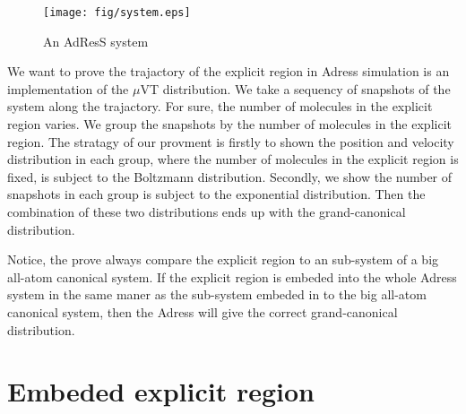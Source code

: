\documentclass[aps,pre,preprint]{revtex4}
\begin{document}



\begin{figure}
  \centering
  \texttt{[image: fig/system.eps]}
  \caption{An AdResS system}
  \label{fig:tmp1}
\end{figure}


We want to prove the trajactory of the explicit region in Adress
simulation is an implementation of the $\mu$VT distribution. We take a
sequency of snapshots of the system along the trajactory.  For sure,
the number of molecules in the explicit region varies. We group the
snapshots by the number of molecules in the explicit region.  The
stratagy of our provment is firstly to shown the position and
velocity distribution in each group, where the number of molecules
in the explicit region is fixed, is subject to the Boltzmann
distribution. Secondly, we show the number of snapshots in each group
is subject to the exponential distribution. Then the combination of
these two distributions ends up with the grand-canonical distribution.

Notice, the prove always compare the explicit region to an sub-system
of a big all-atom canonical system. If the explicit region is embeded
into the whole Adress system in the same maner as the sub-system
embeded in to the big all-atom canonical system, then the Adress will
give the correct grand-canonical distribution.

\section{Embeded explicit region}
\end{document}
